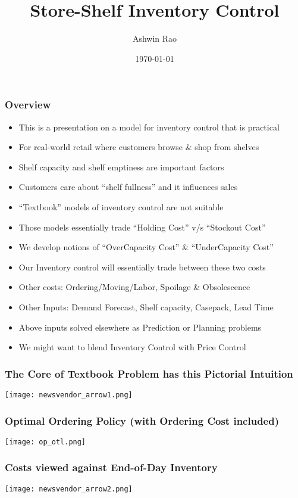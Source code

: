 \documentclass[handout]{beamer}
\title[Shelf Inventory Control]{Store-Shelf Inventory Control} %
\author{Ashwin Rao} %
\institute[Stanford] %
{
ICME, Stanford University
}
\date{\today} %
\begin{document}
\begin{frame}
\titlepage %
\end{frame}


\begin{frame}
\frametitle{Overview}
\pause
\begin{itemize}[<+->]
\item This is a presentation on a model for inventory control that is practical
\item For real-world retail where customers browse \& shop from shelves
\item Shelf capacity and shelf emptiness are important factors
\item Customers care about ``shelf fullness'' and it influences sales
\item ``Textbook'' models of inventory control are not suitable
\item Those models essentially trade ``Holding Cost''  v/s ``Stockout Cost''
\item We develop notions of ``OverCapacity Cost'' \& ``UnderCapacity Cost''
\item Our Inventory control will essentially trade between these two costs
\item Other costs: Ordering/Moving/Labor, Spoilage \& Obsolescence 
\item Other Inputs: Demand Forecast, Shelf capacity, Casepack, Lead Time
\item Above inputs solved elsewhere as Prediction or Planning problems
\item We might want to blend Inventory Control with Price Control
\end{itemize}
\end{frame}

\begin{frame}
\frametitle{The Core of Textbook Problem has this Pictorial Intuition}
\texttt{[image: newsvendor\_arrow1.png]}
\end{frame}


\begin{frame}
\frametitle{Optimal Ordering Policy (with Ordering Cost included)}
\texttt{[image: op\_otl.png]}
\end{frame}

\begin{frame}
\frametitle{Costs viewed against End-of-Day Inventory}
\texttt{[image: newsvendor\_arrow2.png]}
\end{frame}
\end{document}
